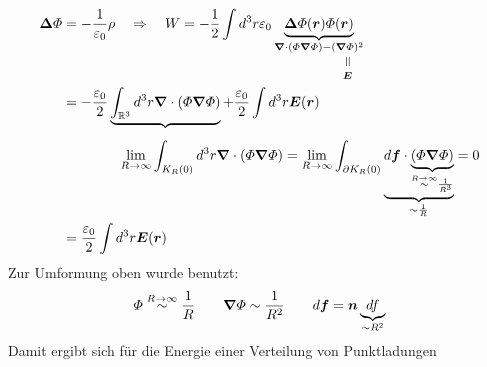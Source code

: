 \documentclass[titlepage,11pt,a4paper,ngerman]{report}
\newcommand{\ub}[1]{\underbrace{#1}}
\newcommand{\verteq}{\rotatebox{90}{$\,=$}}
\newcommand{\equalto}[2]{\underset{\scriptstyle\overset{\mkern4mu\verteq}{#2}}{#1}}
\renewcommand{\Phi}{\varPhi}
\renewcommand{\vec}[1]{\boldsymbol{#1}}
\renewcommand{\epsilon}{\varepsilon}
\begin{document}
\begin{align*}
\vec\Delta \Phi &= - \frac{1}{\epsilon_0} \rho \quad \Rightarrow \quad W = -\frac{1}{2} \int d^3r \epsilon_0 \ub{\vec\Delta \Phi(\vec{r}) \Phi(\vec{r})}_{\vec{\nabla} \cdot (\Phi \vec{\nabla} \Phi) - \equalto{(\vec{\nabla} \Phi)^2}{\vec{E}} }\\
&= -\frac{\epsilon_0}{2} \ub{\int_{\mathbb{R}^3} d^3r \vec{\nabla} \cdot (\Phi \vec{\nabla} \Phi)} + \frac{\epsilon_0}{2} \int d^3r \vec{E}(\vec{r})\\[5pt]
& \qquad \qquad \lim\limits_{R\to \infty} \int_{K_R(0)} d^3r \vec{\nabla} \cdot (\Phi \vec{\nabla} \Phi) = \lim\limits_{R \to \infty} \int_{\partial K_R(0)} \ub{d\vec{f} \cdot \ub{(\Phi \vec{\nabla}\Phi)}_{\buildrel {R\to \infty} \over \sim \frac{1}{R^3}}}_{\sim \frac{1}{R}} = 0\\
&= \frac{\epsilon_0}{2} \int d^3r \vec{E}(\vec{r})
\end{align*}
Zur Umformung oben wurde benutzt:
\begin{equation*}
\Phi \buildrel R\to \infty \over \sim \frac{1}{R} \qquad \vec{\nabla} \Phi \sim \frac{1}{R^2}\qquad d\vec{f} = \vec{n} \ub{df}_{\sim R^2}
\end{equation*}
Damit ergibt sich für die Energie einer Verteilung von Punktladungen 
\end{document}
